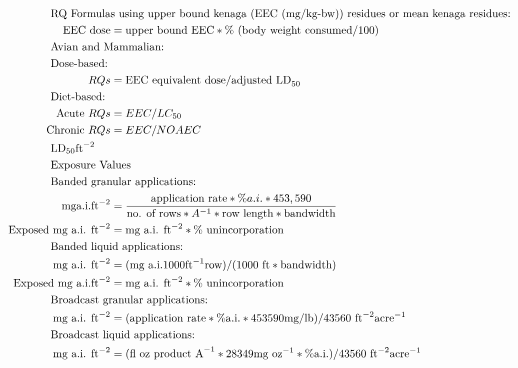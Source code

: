 \documentclass[10pt]{article}
\begin{document}
\begin{align*}
& \hspace{-0.75in}  \text{RQ Formulas using upper bound kenaga (EEC (mg/kg-bw)) residues or mean kenaga residues:} \nonumber \\
\text{EEC dose} & = \text{upper bound EEC}* \% \text{ (body weight consumed}/100)\\
& \hspace{-0.75in} \text{Avian and Mammalian:}\\
& \hspace{-0.75in} \text{Dose-based:}\\
RQs & = \text{EEC equivalent dose} / \text{adjusted LD}_{50}\\
& \hspace{-0.75in} \text{Diet-based:}\\
\text{Acute } RQs & = EEC / LC_{50}\\
\text{Chronic } RQs & = EEC / NOAEC\\
& \hspace{-0.75in}  \text{LD}_{50}\text{ft}^{-2} \nonumber \\
& \hspace{-0.75in}  \text{Exposure Values} \nonumber \\
& \hspace{-0.75in}  \text{Banded granular applications:} \nonumber \\
\text{mga.i.ft}^{-2} & = \frac{\text{application rate}*\% a.i.*453,590}{\text{no. of rows} * A^{-1}*\text{row length}*\text{bandwidth}}\\
\text{Exposed mg a.i. ft}^{-2} & = \text{mg a.i. ft}^{-2} * \% \text{ unincorporation}\\
& \hspace{-0.75in}  \text{Banded liquid applications:} \nonumber \\
\text{mg a.i. ft}^{-2} & = (\text{mg a.i.1000ft}^{-1}\text{row}) / (1000 \text{ ft}*\text{bandwidth})\\
\text{Exposed mg a.i.ft}^{-2} & = \text{mg a.i. ft}^{-2}*\%\text{ unincorporation}\\
& \hspace{-0.75in}  \text{Broadcast granular applications:} \nonumber \\
\text{mg a.i. ft}^{-2} & = \text{(application rate}*{\% \text{a.i.}}* 453590 \text{mg/lb}) / 43560 \text{ ft}^{-2}\text{acre}^{-1}\\
& \hspace{-0.75in}  \text{Broadcast liquid applications:} \nonumber \\
\text{mg a.i. ft}^{-2} & = \text{(fl oz product A}^{-1} * 28349 \text{mg oz}^{-1} * \% \text{a.i.}) / 43560 \text{ ft}^{-2}\text{acre}^{-1}\\

\end{align*}
\end{document}
